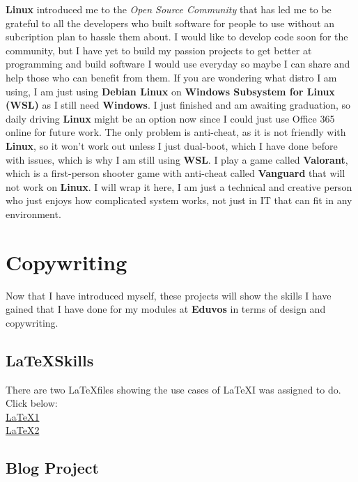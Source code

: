 \documentclass[12pt]{article}
\begin{document}
\textbf{Linux} introduced me to the \textit{Open Source Community} that has led me to be grateful to all the developers who built software for people to use without an subcription plan to hassle them about. I would like to develop code soon for the community, but I have yet to build my passion projects to get better at programming and build software I would use everyday so maybe I can share and help those who can benefit from them. If you are wondering what distro I am using, I am just using \textbf{Debian Linux} on \textbf{Windows Subsystem for Linux (WSL)} as I still need \textbf{Windows}. I just finished and am awaiting graduation, so daily driving \textbf{Linux} might be an option now since I could just use Office 365 online for future work. The only problem is anti-cheat, as it is not friendly with \textbf{Linux}, so it won't work out unless I just dual-boot, which I have done before with issues, which is why I am still using \textbf{WSL}. I play a game called \textbf{Valorant}, which is a first-person shooter game with anti-cheat called \textbf{Vanguard} that will not work on \textbf{Linux}. I will wrap it here, I am just a technical and creative person who just enjoys how complicated system works, not just in IT that can fit in any environment.

\newpage
\section{Copywriting}
Now that I have introduced myself, these projects will show the skills I have gained that I have done for my modules at \textbf{Eduvos} in terms of design and copywriting.

\subsection{\LaTeX Skills}
There are two \LaTeX files showing the use cases of \LaTeX I was assigned to do.\\

Click below:\\
\href{https://github.com/hakimyusuf48/Collection-of-Copyright-and-Design/blob/main/LaTex/LaTex_1.tex}{\LaTeX 1} \\
\href{https://github.com/hakimyusuf48/Collection-of-Copyright-and-Design/blob/main/LaTex/LaTex_2.tex}{\LaTeX 2}


\subsection{Blog Project}
\end{document}
